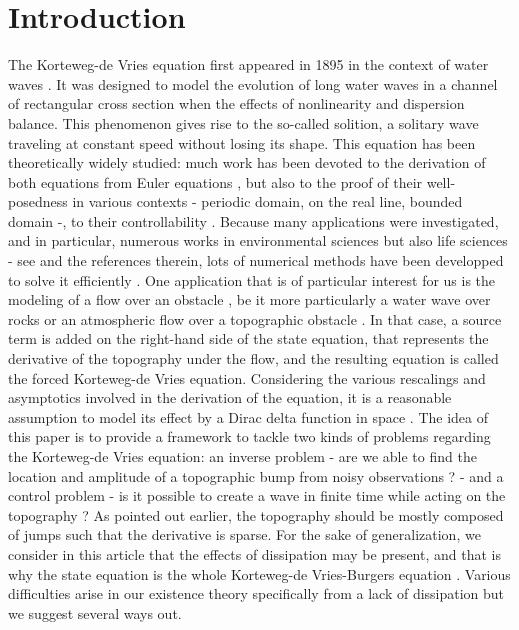 
\section{Introduction}

The Korteweg-de Vries equation first appeared in 1895 in the context of water waves \cite{korteweg1895xli}. It was designed to model the evolution of long water waves in a channel of rectangular cross section when the effects of nonlinearity and dispersion balance. This phenomenon gives rise to the so-called solition, a solitary wave traveling at constant speed without losing its shape. This equation has been theoretically widely studied: much work has been devoted to the derivation of both equations from Euler equations \cite{shen1992forced,constantin2008,su2003korteweg}, but also to the proof of their well-posedness in various contexts \cite{miura1976korteweg,kenig1993,bourgain1997periodic} - periodic domain, on the real line, bounded domain -, to their controllability \cite{rosier1997exact,glass2008some,coron2003exact,chapouly2009global}.
Because many applications were investigated, and in particular, numerous works in environmental sciences but also life sciences - see \cite{dauxois2006physics,whitham2011linear,Crepeau2007594,yomosa1987} and the references therein, lots of numerical methods have been developped to solve it efficiently \cite{trefethen2000spectral,shen2003new,ma2000legendre}. One application that is of particular interest for us is the modeling of a flow over an obstacle \cite{milewski2004forced,shen1992forced,shen1996accuracy}, be it more particularly a water wave over rocks or an atmospheric flow over a topographic obstacle \cite{baines1997topographic}. In that case, a source term is added on the right-hand side of the state equation, that represents the derivative of the topography under the flow, and the resulting equation is called the forced Korteweg-de Vries equation. Considering the various rescalings and asymptotics involved in the derivation of the \KdV equation, it is a reasonable assumption to model its effect by a Dirac delta function in space \cite{shen1996accuracy, shen2000bumpdirac}. The idea of this paper is to provide a framework to tackle two kinds of problems regarding the Korteweg-de Vries equation: an inverse problem - are we able to find the location and amplitude of a topographic bump from noisy observations ? -  and a control problem - is it possible to create a wave in finite time while acting on the topography ? As pointed out earlier, the topography should be mostly composed of jumps such that the derivative is sparse. For the sake of generalization, we consider in this article that the effects of dissipation may be present, and that is why the state equation is the whole Korteweg-de Vries-Burgers equation \cite{su2003korteweg}. Various difficulties arise in our existence theory specifically from a lack of dissipation but we suggest several ways out.

